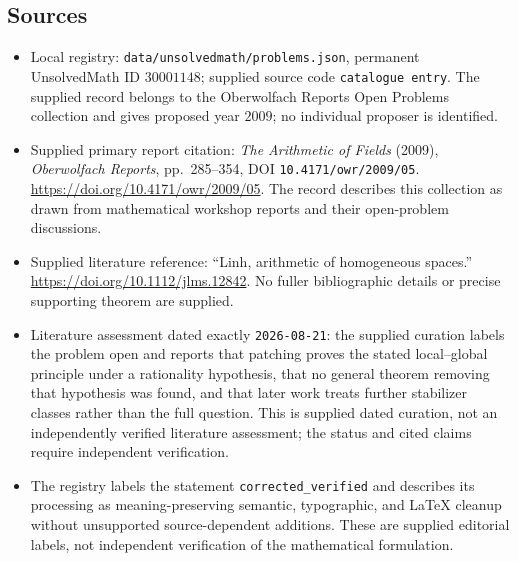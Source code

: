 \documentclass[11pt]{article}
\begin{document}
\subsection{Sources}
\begin{itemize}
\item Local registry: \texttt{data/unsolvedmath/problems.json}, permanent UnsolvedMath ID \(30001148\); supplied source code \texttt{catalogue entry}. The supplied record belongs to the Oberwolfach Reports Open Problems collection and gives proposed year \(2009\); no individual proposer is identified.
\item Supplied primary report citation: \emph{The Arithmetic of Fields} (2009), \emph{Oberwolfach Reports}, pp.~285--354, DOI \texttt{10.4171/owr/2009/05}. \url{https://doi.org/10.4171/owr/2009/05}. The record describes this collection as drawn from mathematical workshop reports and their open-problem discussions.
\item Supplied literature reference: ``Linh, arithmetic of homogeneous spaces.'' \url{https://doi.org/10.1112/jlms.12842}. No fuller bibliographic details or precise supporting theorem are supplied.
\item Literature assessment dated exactly \texttt{2026-08-21}: the supplied curation labels the problem open and reports that patching proves the stated local--global principle under a rationality hypothesis, that no general theorem removing that hypothesis was found, and that later work treats further stabilizer classes rather than the full question. This is supplied dated curation, not an independently verified literature assessment; the status and cited claims require independent verification.
\item The registry labels the statement \texttt{corrected\_verified} and describes its processing as meaning-preserving semantic, typographic, and LaTeX cleanup without unsupported source-dependent additions. These are supplied editorial labels, not independent verification of the mathematical formulation.
\end{itemize}
\end{document}
